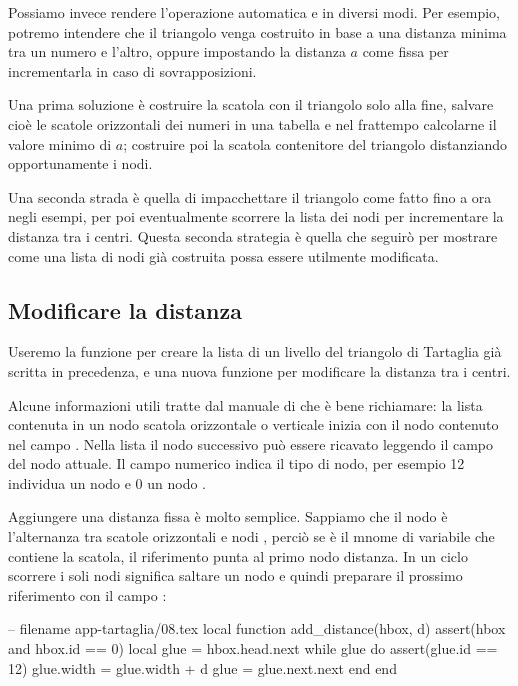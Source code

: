 Possiamo invece rendere l'operazione automatica e in diversi modi. Per esempio,
potremo intendere che il triangolo venga costruito in base a una distanza minima
tra un numero e l'altro, oppure impostando la distanza \( a \) come fissa per
incrementarla in caso di sovrapposizioni.

Una prima soluzione è costruire la scatola con il triangolo solo alla fine,
salvare cioè le scatole orizzontali dei numeri in una tabella e nel frattempo
calcolarne il valore minimo di \( a \); costruire poi la scatola contenitore del
triangolo distanziando opportunamente i nodi.

Una seconda strada è quella di impacchettare il triangolo come fatto fino a ora
negli esempi, per poi eventualmente scorrere la lista dei nodi per incrementare
la distanza tra i centri. Questa seconda strategia è quella che seguirò per
mostrare come una lista di nodi già costruita possa essere utilmente
modificata.




\subsection{Modificare la distanza}

Useremo la funzione  per creare la lista di un livello del
triangolo di Tartaglia già scritta in precedenza, e una nuova funzione
 per modificare la distanza tra i centri.

Alcune informazioni utili tratte dal manuale di \LuaTeX{} che è bene richiamare:
la lista contenuta in un nodo scatola orizzontale o verticale inizia con il nodo
contenuto nel campo . Nella lista il nodo successivo può essere
ricavato leggendo il campo  del nodo attuale. Il campo numerico
 indica il tipo di nodo, per esempio 12 individua un nodo  e
0 un nodo .

Aggiungere una distanza fissa è molto semplice. Sappiamo che il nodo 
è l'alternanza tra scatole orizzontali e nodi , perciò se 
è il mnome di variabile che contiene la scatola, il riferimento
 punta al primo nodo distanza. In un ciclo 
scorrere i soli nodi  significa saltare un nodo e quindi preparare il
prossimo riferimento con il campo :
\begin{lines}
-- filename app-tartaglia/08.tex
local function add_distance(hbox, d)
    assert(hbox and hbox.id == 0)
    local glue = hbox.head.next
    while glue do
        assert(glue.id == 12)
        glue.width = glue.width + d
        glue = glue.next.next
    end
end
\end{lines}

